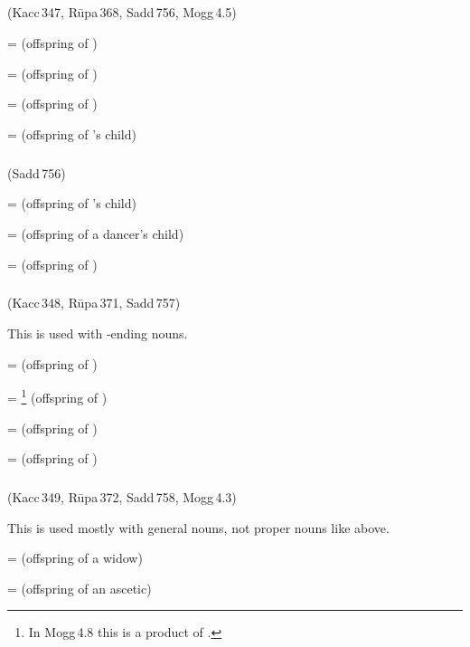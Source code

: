 \subparagraph*{} (Kacc\,347, R\=upa\,368, Sadd\,756, Mogg\,4.5)\label{pacct1:dni}

 =  (offspring of ) \par
{} =  (offspring of ) \par
{} =  (offspring of ) \par
{} =  (offspring of 's child) \par

\subparagraph*{} (Sadd\,756)\label{pacct1:dnika}\label{pacct1:dniya}

 =  (offspring of 's child) \par
{} =  (offspring of a dancer's child) \par
{} =  (offspring of ) \par

\subparagraph*{} (Kacc\,348, R\=upa\,371, Sadd\,757)\label{pacct1:dnava}

This  is used with -ending nouns.

 =  (offspring of ) \par
{} = \footnote{In Mogg\,4.8 this is a product of .} (offspring of ) \par
{} =  (offspring of ) \par
{} =  (offspring of ) \par

\subparagraph*{} (Kacc\,349, R\=upa\,372, Sadd\,758, Mogg\,4.3)\label{pacct1:dnera}

This  is used mostly with general nouns, not proper nouns like above.

 =  (offspring of a widow) \par
{} =  (offspring of an ascetic) \par

